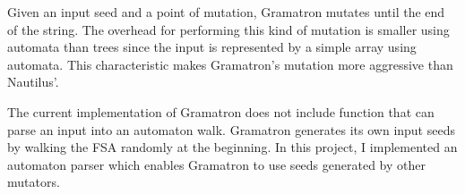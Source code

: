 Given an input seed and a point of mutation, Gramatron mutates until the end of the string. The overhead for performing this kind of mutation is smaller using automata than trees since the input is represented by a simple array using automata. This characteristic makes Gramatron's mutation more aggressive than Nautilus'. 

The current implementation of Gramatron does not include function that can parse an input into an automaton walk. Gramatron generates its own input seeds by walking the FSA randomly at the beginning. In this project, I implemented an automaton parser which enables Gramatron to use seeds generated by other mutators.



% 

